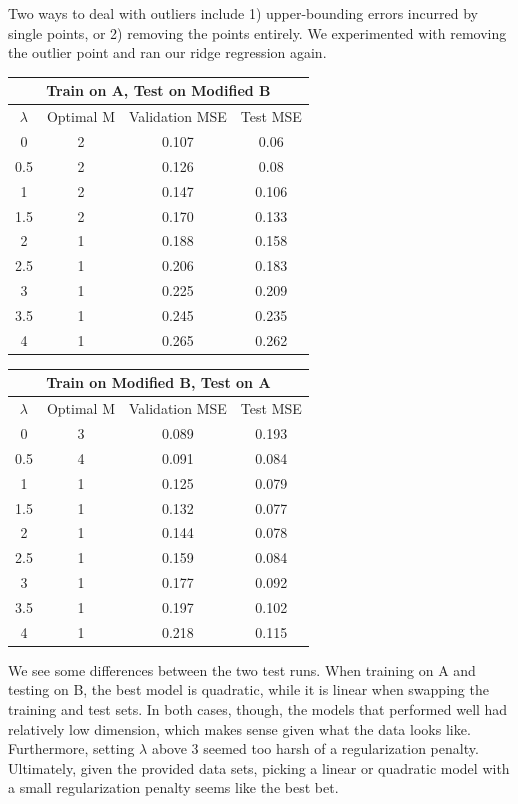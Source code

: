 \documentclass{article}
\begin{document}
Two ways to deal with outliers include 1) upper-bounding errors incurred by single points, or 2) removing the points entirely. We experimented with removing the outlier point and ran our ridge regression again.

\begin{center}
 \begin{tabular}{||c c c c||} 
 \hline
 \multicolumn{4}{|c|}{Train on A, Test on Modified B} \\
 \hline
 \hline
 $\lambda$ & Optimal M & Validation MSE & Test MSE\\ [0.5ex] 
 \hline\hline
 0 & 2 & 0.107 & 0.06 \\ 
 \hline
 0.5 & 2 & 0.126 & 0.08 \\
 \hline
 1 & 2 & 0.147 & 0.106 \\
 \hline
 1.5 & 2 & 0.170 & 0.133 \\
 \hline
2 & 1 & 0.188 & 0.158 \\
 \hline
2.5 & 1 & 0.206 & 0.183 \\
 \hline
3 & 1 & 0.225 & 0.209 \\
 \hline
 3.5 & 1 & 0.245 & 0.235 \\
 \hline
4 & 1 & 0.265 & 0.262 \\
 \hline
\end{tabular}
\quad
 \begin{tabular}{||c c c c||} 
 \hline
 \multicolumn{4}{|c|}{Train on Modified B, Test on A} \\
 \hline
 \hline
 $\lambda$ & Optimal M & Validation MSE & Test MSE\\ [0.5ex] 
 \hline\hline
 0 & 3 & 0.089 & 0.193 \\ 
 \hline
 0.5 & 4 & 0.091 & 0.084 \\
 \hline
 1 & 1 & 0.125 & 0.079 \\
 \hline
 1.5 & 1 & 0.132 & 0.077 \\
 \hline
2 & 1 & 0.144 & 0.078 \\
 \hline
2.5 & 1 & 0.159 & 0.084 \\
 \hline
3 & 1 & 0.177 & 0.092 \\
 \hline
 3.5 & 1 & 0.197 & 0.102 \\
 \hline
4 & 1 & 0.218 & 0.115 \\
 \hline
\end{tabular}
\end{center}

We see some differences between the two test runs. When training on A and testing on B, the best model is quadratic, while it is linear when swapping the training and test sets. In both cases, though, the models that performed well had relatively low dimension, which makes sense given what the data looks like. Furthermore, setting $\lambda$ above 3 seemed too harsh of a regularization penalty. Ultimately, given the provided data sets, picking a linear or quadratic model with a small regularization penalty seems like the best bet.
\end{document}
